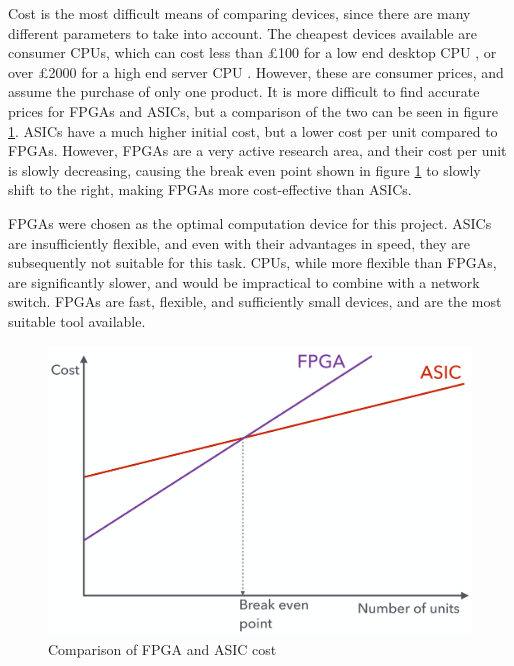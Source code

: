 Cost is the most difficult means of comparing devices, since there are many different parameters to take into account. The cheapest devices available are consumer CPUs, which can cost less than £100 for a low end desktop CPU \cite{scan_celeron_g4900} \cite{intel_celeron_g4900}, or over £2000 for a high end server CPU \cite{scan_xeon_gold_6132} \cite{intel_xeon_gold_6132}.
However, these are consumer prices, and assume the purchase of only one product.
It is more difficult to find accurate prices for FPGAs and ASICs, but a comparison of the two can be seen in figure \ref{fpga_asic_cost_tradeoff}. ASICs have a much higher initial cost, but a lower cost per unit compared to FPGAs.
However, FPGAs are a very active research area, and their cost per unit is slowly decreasing, causing the break even point shown in figure \ref{fpga_asic_cost_tradeoff} to slowly shift to the right, making FPGAs more cost-effective than ASICs.

FPGAs were chosen as the optimal computation device for this project. ASICs are insufficiently flexible, and even with their advantages in speed, they are subsequently not suitable for this task. CPUs, while more flexible than FPGAs, are significantly slower, and would be impractical to combine with a network switch. FPGAs are fast, flexible, and sufficiently small devices, and are the most suitable tool available.

\begin{figure}[ht!]
  \centering
  \includegraphics[width=\textwidth]{assets/fpga_asic_cost_tradeoff.png}
  \caption{Comparison of FPGA and ASIC cost \cite{es3b2}}
  \label{fpga_asic_cost_tradeoff}
\end{figure}


